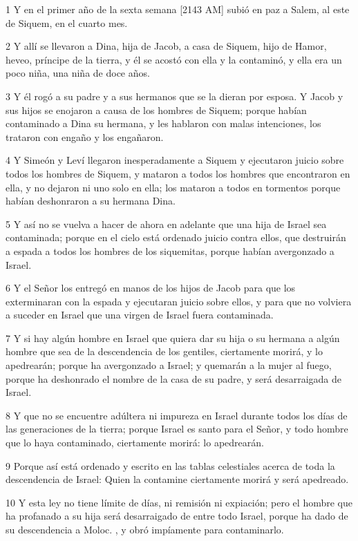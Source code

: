\par 1 Y en el primer año de la sexta semana [2143 AM] subió en paz a Salem, al este de Siquem, en el cuarto mes.
\par 2 Y allí se llevaron a Dina, hija de Jacob, a casa de Siquem, hijo de Hamor, heveo, príncipe de la tierra, y él se acostó con ella y la contaminó, y ella era un poco niña, una niña de doce años.
\par 3 Y él rogó a su padre y a sus hermanos que se la dieran por esposa. Y Jacob y sus hijos se enojaron a causa de los hombres de Siquem; porque habían contaminado a Dina su hermana, y les hablaron con malas intenciones, los trataron con engaño y los engañaron.
\par 4 Y Simeón y Leví llegaron inesperadamente a Siquem y ejecutaron juicio sobre todos los hombres de Siquem, y mataron a todos los hombres que encontraron en ella, y no dejaron ni uno solo en ella; los mataron a todos en tormentos porque habían deshonraron a su hermana Dina.
\par 5 Y así no se vuelva a hacer de ahora en adelante que una hija de Israel sea contaminada; porque en el cielo está ordenado juicio contra ellos, que destruirán a espada a todos los hombres de los siquemitas, porque habían avergonzado a Israel.
\par 6 Y el Señor los entregó en manos de los hijos de Jacob para que los exterminaran con la espada y ejecutaran juicio sobre ellos, y para que no volviera a suceder en Israel que una virgen de Israel fuera contaminada.
\par 7 Y si hay algún hombre en Israel que quiera dar su hija o su hermana a algún hombre que sea de la descendencia de los gentiles, ciertamente morirá, y lo apedrearán; porque ha avergonzado a Israel; y quemarán a la mujer al fuego, porque ha deshonrado el nombre de la casa de su padre, y será desarraigada de Israel.
\par 8 Y que no se encuentre adúltera ni impureza en Israel durante todos los días de las generaciones de la tierra; porque Israel es santo para el Señor, y todo hombre que lo haya contaminado, ciertamente morirá: lo apedrearán.
\par 9 Porque así está ordenado y escrito en las tablas celestiales acerca de toda la descendencia de Israel: Quien la contamine ciertamente morirá y será apedreado.
\par 10 Y esta ley no tiene límite de días, ni remisión ni expiación; pero el hombre que ha profanado a su hija será desarraigado de entre todo Israel, porque ha dado de su descendencia a Moloc. , y obró impíamente para contaminarlo.

